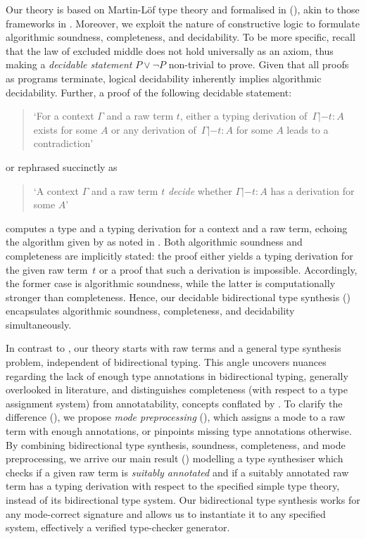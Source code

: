 Our theory is based on Martin-L\"of type theory and formalised in \Agda (), akin to those frameworks in .
Moreover, we exploit the nature of constructive logic to formulate algorithmic soundness, completeness, and decidability. 
To be more specific, recall that the law of excluded middle does not hold universally as an axiom, thus making a \emph{decidable statement} $P \vee \neg P$ non-trivial to prove.
Given that all proofs as programs terminate, logical decidability inherently implies algorithmic decidability.
Further, a proof of the following decidable statement:
\begin{quote}
  `For a context $\Gamma$ and a raw term $t$, either a typing derivation of\, $\Gamma |- t : A$ exists for some $A$ or any derivation of\, $\Gamma |- t : A$ for some $A$ leads to a contradiction'
\end{quote}
or rephrased succinctly as 
\begin{quote}
  `A context $\Gamma$ and a raw term $t$ \emph{decide} whether $\Gamma |- t : A$ has a derivation for some $A$'
\end{quote}
computes a type and a typing derivation for a context and a raw term, echoing the algorithm given by \citeauthor{Wadler2022} as noted in .
Both algorithmic soundness and completeness are implicitly stated:
the proof either yields a typing derivation for the given raw term~$t$ or a proof that such a derivation is impossible.
Accordingly, the former case is algorithmic soundness, while the latter is computationally stronger than completeness.
Hence, our decidable bidirectional type synthesis () encapsulates algorithmic soundness, completeness, and decidability simultaneously. 

In contrast to \citeauthor{Wadler2022}, our theory starts with raw terms and a general type synthesis problem, independent of bidirectional typing.
This angle uncovers nuances regarding the lack of enough type annotations in bidirectional typing, generally overlooked in literature, and distinguishes completeness (with respect to a type assignment system) from annotatability, concepts conflated by \citet{Dunfield2021}. 
To clarify the difference (), we propose \emph{mode preprocessing} (), which assigns a mode to a raw term with enough annotations, or pinpoints missing type annotations otherwise.
By combining bidirectional type synthesis, soundness, completeness, and mode preprocessing, we arrive our main result () modelling a type synthesiser which checks if a given raw term is \emph{suitably annotated} and if a suitably annotated raw term has a typing derivation with respect to the specified simple type theory, instead of its bidirectional type system.
Our bidirectional type synthesis works for any mode-correct signature and allows us to instantiate it to any specified system, effectively a verified type-checker generator. 

